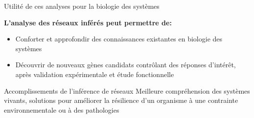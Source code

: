 \begin{frame}{Utilité de ces analyses pour la biologie des systèmes}

\textbf{L'analyse des réseaux inférés peut permettre de:}
    \begin{itemize} \small
    \item Conforter et approfondir des connaissances existantes en biologie des systèmes
        \item Découvrir de nouveaux gènes candidats contrôlant des réponses d'intérêt, après validation expérimentale et étude fonctionnelle
    \end{itemize}
    
    \vspace{0.5cm}
    \begin{alertblock}{Accomplissements de l'inférence de réseaux}
	Meilleure compréhension des systèmes vivants, solutions pour améliorer la résilience d'un organisme à une contrainte environnementale ou à des pathologies
	\end{alertblock}
	
    
\end{frame}
	

